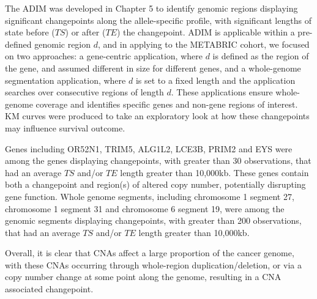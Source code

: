 The ADIM was developed in Chapter 5 to identify genomic regions displaying significant changepoints along the allele-specific profile, with significant lengths of state before ($TS$) or after ($TE$) the changepoint. ADIM is applicable within a pre-defined genomic region $d$, and in applying to the METABRIC cohort, we focused on two approaches: a gene-centric application, where $d$ is defined as the region of the gene, and assumed different in size for different genes, and a whole-genome segmentation application, where $d$ is set to a fixed length and the application searches over consecutive regions of length $d$. These applications ensure whole-genome coverage and identifies specific genes and non-gene regions of interest. KM curves were produced to take an exploratory look at how these changepoints may influence survival outcome. 

Genes including OR52N1, TRIM5, ALG1L2, LCE3B, PRIM2 and EYS were among the genes displaying changepoints, with greater than 30 observations, that had an average $TS$ and/or $TE$ length greater than 10,000kb. These genes contain both a changepoint and region(s) of altered copy number, potentially disrupting gene function. Whole genome segments, including chromosome 1 segment 27, chromosome 1 segment 31 and chromosome 6 segment 19, were among the genomic segments displaying changepoints, with greater than 200 observations, that had an average $TS$ and/or $TE$ length greater than 10,000kb.

Overall, it is clear that CNAs affect a large proportion of the cancer genome, with these CNAs occurring through whole-region duplication/deletion, or via a copy number change at some point along the genome, resulting in a CNA associated changepoint. 